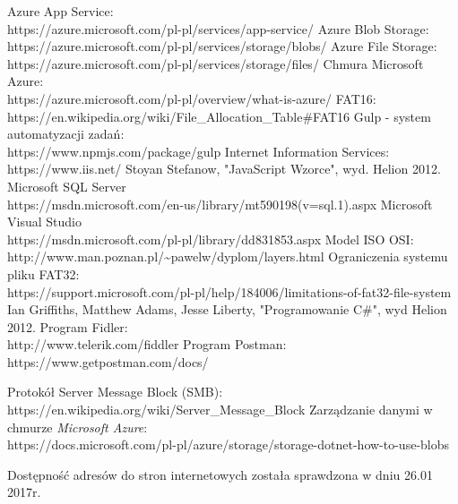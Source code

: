 \begin{thebibliography}{1}
Azure App Service:
\\	
https://azure.microsoft.com/pl-pl/services/app-service/
Azure Blob Storage:
\\
https://azure.microsoft.com/pl-pl/services/storage/blobs/
Azure File Storage:
\\
https://azure.microsoft.com/pl-pl/services/storage/files/
Chmura Microsoft Azure:
\\
https://azure.microsoft.com/pl-pl/overview/what-is-azure/
FAT16:
\\
https://en.wikipedia.org/wiki/File\_Allocation\_Table\#FAT16
Gulp - system automatyzacji zadań:
\\ 
https://www.npmjs.com/package/gulp
 Internet Information Services:
\\
https://www.iis.net/
 Stoyan Stefanow, "JavaScript Wzorce", wyd. Helion 2012.
 Microsoft SQL Server
\\
https://msdn.microsoft.com/en-us/library/mt590198(v=sql.1).aspx
 Microsoft Visual Studio
\\
https://msdn.microsoft.com/pl-pl/library/dd831853.aspx
Model ISO OSI:
\\
http://www.man.poznan.pl/\textasciitilde pawelw/dyplom/layers.html
Ograniczenia systemu pliku FAT32:
\\ https://support.microsoft.com/pl-pl/help/184006/limitations-of-fat32-file-system
 Ian Griffiths, Matthew Adams, Jesse Liberty, "Programowanie C\#", wyd Helion 2012.
Program Fidler:
\\
http://www.telerik.com/fiddler
Program Postman:
\\
https://www.getpostman.com/docs/

Protokół Server Message Block (SMB):
\\
https://en.wikipedia.org/wiki/Server\_Message\_Block
Zarządzanie danymi w chmurze \textit{Microsoft Azure}:
\\
https://docs.microsoft.com/pl-pl/azure/storage/storage-dotnet-how-to-use-blobs
\end{thebibliography}
Dostępność adresów do stron internetowych została sprawdzona w dniu 26.01 2017r.